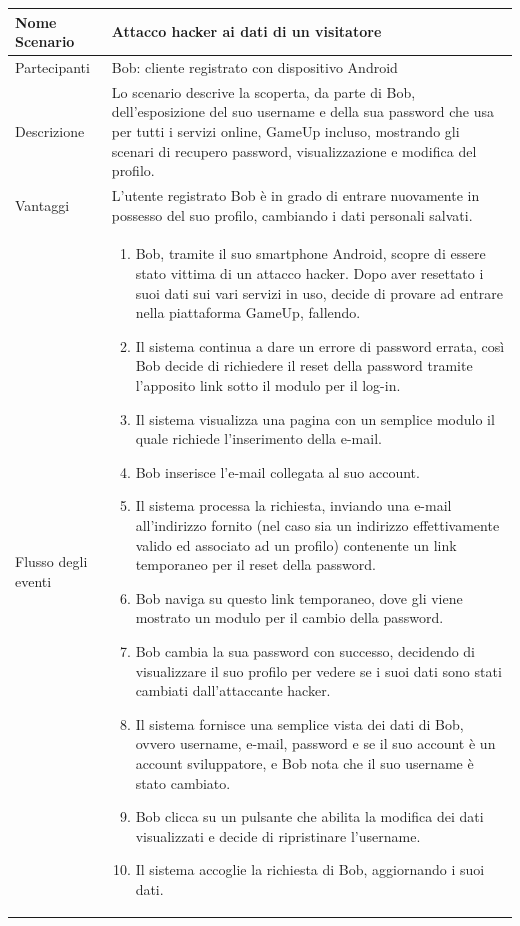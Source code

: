 \small\begin{tabular}{|| l | p{30em} ||} 
	\hline
	Nome Scenario & Attacco hacker ai dati di un visitatore\\
	\hline
	Partecipanti & Bob: cliente registrato con dispositivo Android\\
	\hline
	Descrizione & Lo scenario descrive la scoperta, da parte di Bob, dell’esposizione del suo username e della sua password che usa per tutti i servizi online, GameUp incluso, mostrando gli scenari di recupero password, visualizzazione e modifica del profilo.\\
	\hline
	Vantaggi & L’utente registrato Bob è in grado di entrare nuovamente in possesso del suo profilo, cambiando i dati personali salvati.\\
	\hline
	Flusso degli eventi &
	\begin{enumerate}
		\item Bob, tramite il suo smartphone Android, scopre di essere stato vittima di un attacco hacker. Dopo aver resettato i suoi dati sui vari servizi in uso, decide di provare ad entrare nella piattaforma GameUp, fallendo.
		\item Il sistema continua a dare un errore di password errata, così Bob decide di richiedere il reset della password tramite l’apposito link sotto il modulo per il log-in.
		\item Il sistema visualizza una pagina con un semplice modulo il quale richiede l’inserimento della e-mail.
		\item Bob inserisce l’e-mail collegata al suo account.
		\item Il sistema processa la richiesta, inviando una e-mail all’indirizzo fornito (nel caso sia un indirizzo effettivamente valido ed associato ad un profilo) contenente un link temporaneo per il reset della password.
		\item Bob naviga su questo link temporaneo, dove gli viene mostrato un modulo per il cambio della password.
		\item Bob cambia la sua password con successo, decidendo di visualizzare il suo profilo per vedere se i suoi dati sono stati cambiati dall’attaccante hacker.
		\item Il sistema fornisce una semplice vista dei dati di Bob, ovvero username, e-mail, password e se il suo account è un account sviluppatore, e Bob nota che il suo username è stato cambiato.
		\item Bob clicca su un pulsante che abilita la modifica dei dati visualizzati e decide di ripristinare l’username.
		\item Il sistema accoglie la richiesta di Bob, aggiornando i suoi dati.
	\end{enumerate} \\
	\hline
	\end{tabular}

